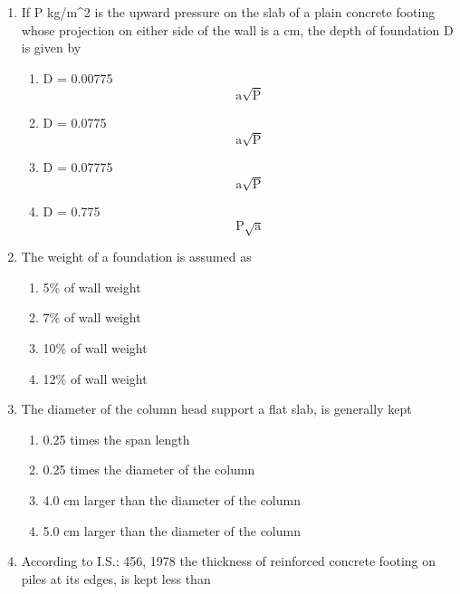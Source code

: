 \documentclass[11pt,a4paper]{article}
\begin{document}
\begin{enumerate}
{}
\\
\item{If P kg/m\^{}2 is the upward pressure on the slab of a plain concrete footing whose projection on either side of the wall is a cm, the depth of foundation D is given by
}
\begin{enumerate}[label=\Alph*.]
\item{D = 0.00775 $${\text{a}}\sqrt {\text{P}} $$}
\item{D = 0.0775 $${\text{a}}\sqrt {\text{P}} $$}
\item{D = 0.07775 $${\text{a}}\sqrt {\text{P}} $$}
\item{D = 0.775 $${\text{P}}\sqrt {\text{a}} $$}
\end{enumerate}
\item{The weight of a foundation is assumed as}
\begin{enumerate}[label=\Alph*.]
\item{5\% of wall weight}
\item{7\% of wall weight}
\item{10\% of wall weight}
\item{12\% of wall weight}
\end{enumerate}
\item{The diameter of the column head support a flat slab, is generally kept}
\begin{enumerate}[label=\Alph*.]
\item{0.25 times the span length}
\item{0.25 times the diameter of the column}
\item{4.0 cm larger than the diameter of the column}
\item{5.0 cm larger than the diameter of the column}
\end{enumerate}
\item{According to I.S.: 456, 1978 the thickness of reinforced concrete footing on piles at its edges, is kept less than}

\end{enumerate}
\end{document}
